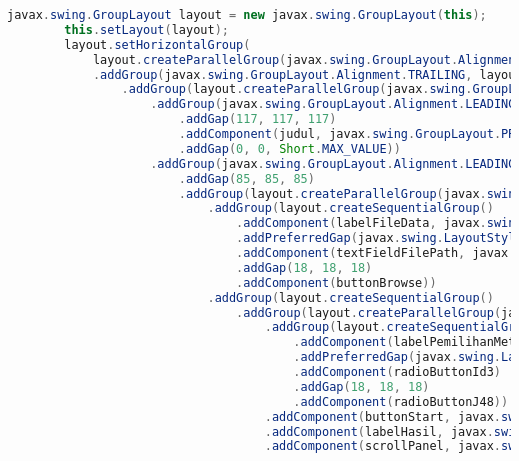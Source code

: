 \begin{lstlisting}[language=Java,basicstyle=\tiny,caption=View.java]
        javax.swing.GroupLayout layout = new javax.swing.GroupLayout(this);
        this.setLayout(layout);
        layout.setHorizontalGroup(
            layout.createParallelGroup(javax.swing.GroupLayout.Alignment.LEADING)
            .addGroup(javax.swing.GroupLayout.Alignment.TRAILING, layout.createSequentialGroup()
                .addGroup(layout.createParallelGroup(javax.swing.GroupLayout.Alignment.TRAILING)
                    .addGroup(javax.swing.GroupLayout.Alignment.LEADING, layout.createSequentialGroup()
                        .addGap(117, 117, 117)
                        .addComponent(judul, javax.swing.GroupLayout.PREFERRED_SIZE, 399, javax.swing.GroupLayout.PREFERRED_SIZE)
                        .addGap(0, 0, Short.MAX_VALUE))
                    .addGroup(javax.swing.GroupLayout.Alignment.LEADING, layout.createSequentialGroup()
                        .addGap(85, 85, 85)
                        .addGroup(layout.createParallelGroup(javax.swing.GroupLayout.Alignment.LEADING)
                            .addGroup(layout.createSequentialGroup()
                                .addComponent(labelFileData, javax.swing.GroupLayout.DEFAULT_SIZE, 138, Short.MAX_VALUE)
                                .addPreferredGap(javax.swing.LayoutStyle.ComponentPlacement.UNRELATED)
                                .addComponent(textFieldFilePath, javax.swing.GroupLayout.PREFERRED_SIZE, 209, javax.swing.GroupLayout.PREFERRED_SIZE)
                                .addGap(18, 18, 18)
                                .addComponent(buttonBrowse))
                            .addGroup(layout.createSequentialGroup()
                                .addGroup(layout.createParallelGroup(javax.swing.GroupLayout.Alignment.LEADING, false)
                                    .addGroup(layout.createSequentialGroup()
                                        .addComponent(labelPemilihanMethod, javax.swing.GroupLayout.PREFERRED_SIZE, 147, javax.swing.GroupLayout.PREFERRED_SIZE)
                                        .addPreferredGap(javax.swing.LayoutStyle.ComponentPlacement.RELATED)
                                        .addComponent(radioButtonId3)
                                        .addGap(18, 18, 18)
                                        .addComponent(radioButtonJ48))
                                    .addComponent(buttonStart, javax.swing.GroupLayout.PREFERRED_SIZE, 124, javax.swing.GroupLayout.PREFERRED_SIZE)
                                    .addComponent(labelHasil, javax.swing.GroupLayout.PREFERRED_SIZE, 89, javax.swing.GroupLayout.PREFERRED_SIZE)
                                    .addComponent(scrollPanel, javax.swing.GroupLayout.DEFAULT_SIZE, 441, Short.MAX_VALUE)

\end{lstlisting}
